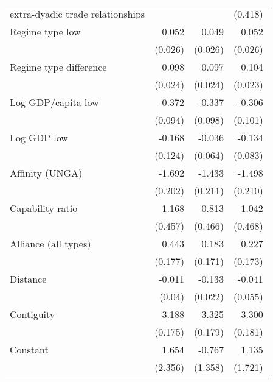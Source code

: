 \begin{table}[htbp]
\begin{tabular}{l*{3}{D{.}{.}{-1}}}
 extra-dyadic trade relationships  &                     &                     &     (0.418)         \\
\addlinespace
Regime type low&      0.052\sym{*}  &      0.049\sym{+}  &      0.052\sym{*}  \\
   &    (0.026)         &    (0.026)         &    (0.026)         \\
\addlinespace
Regime type difference&      0.098\sym{***}&      0.097\sym{***}&       0.104\sym{***}\\
   &    (0.024)         &    (0.024)         &    (0.023)         \\
\addlinespace
Log GDP/capita low&      -0.372\sym{***}&      -0.337\sym{***}&      -0.306\sym{**} \\
   &    (0.094)         &    (0.098)         &     (0.101)         \\
\addlinespace
Log GDP low&      -0.168         &     -0.036         &      -0.134         \\
   &     (0.124)         &    (0.064)         &    (0.083)         \\
\addlinespace
Affinity (UNGA)&      -1.692\sym{***}&      -1.433\sym{***}&      -1.498\sym{***}\\
   &     (0.202)         &     (0.211)         &     (0.210)         \\
\addlinespace
Capability ratio&       1.168\sym{*}  &       0.813\sym{+}  &       1.042\sym{*}  \\
   &     (0.457)         &     (0.466)         &     (0.468)         \\
\addlinespace
Alliance (all types)&       0.443\sym{*}  &       0.183         &       0.227         \\
   &     (0.177)         &     (0.171)         &     (0.173)         \\
\addlinespace
Distance&     -0.011         &      -0.133\sym{***}&     -0.041         \\
   &    (0.04)         &    (0.022)         &    (0.055)         \\
\addlinespace
Contiguity&       3.188\sym{***}&       3.325\sym{***}&       3.300\sym{***}\\
   &     (0.175)         &     (0.179)         &     (0.181)         \\
\addlinespace
Constant&       1.654         &      -0.767         &       1.135         \\
   &     (2.356)         &     (1.358)         &     (1.721)         \\

\end{tabular}
\end{table}
